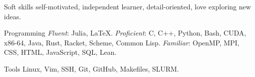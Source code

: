 \begin{skills}
    \item{Soft skills}
        self-motivated, independent learner, detail-oriented,
        love exploring new ideas.
    \item{Programming}
        \textit{Fluent}: Julia, \LaTeX.
        \textit{Proficient}:
            C, C++, Python, Bash, CUDA, x86-64, Java, Rust, Racket,
            Scheme, Common Lisp.
        \textit{Familiar}: OpenMP, MPI, CSS, HTML, JavaScript, SQL, Lean.
    \item{Tools}
        Linux, Vim, SSH, Git, GitHub, Makefiles, SLURM.
\end{skills}
